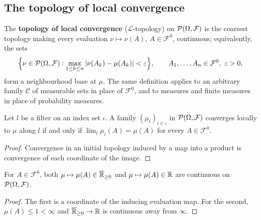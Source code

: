 \subsection*{The topology of local convergence}

\begin{definition}
    \label{def:lc-topology}
    \leanok

    The \textbf{topology of local convergence} ($\mathcal{L}$-topology) on
    $\mathcal{P}(\Omega, \mathcal{F})$ is the coarsest topology making every evaluation
    $\nu \mapsto \nu(A)$, $A \in \mathcal{F}^0$, continuous; equivalently, the sets
    \[
        \Big\{ \nu \in \mathcal{P}(\Omega, \mathcal{F}) : \max_{1 \le k \le n} |\nu(A_k) - \mu(A_k)|
        < \varepsilon \Big\},
        \qquad A_1, \dots, A_n \in \mathcal{F}^0,\ \varepsilon > 0,
    \]
    form a neighbourhood base at $\mu$. The same definition applies to an arbitrary family
    $\mathcal{C}$ of measurable sets in place of $\mathcal{F}^0$, and to measures and finite
    measures in place of probability measures.
\end{definition}

\begin{lemma}
    \label{lem:lc-tendsto-iff}
    \leanok

    Let $l$ be a filter on an index set $\iota$. A family $(\mu_i)_{i \in \iota}$ in
    $\mathcal{P}(\Omega, \mathcal{F})$ converges locally to $\mu$ along $l$ if and only if
    $\lim_l \mu_i(A) = \mu(A)$ for every $A \in \mathcal{F}^0$.
\end{lemma}
\begin{proof}
    \leanok

    Convergence in an initial topology induced by a map into a product is convergence of each
    coordinate of the image.
\end{proof}

\begin{lemma}
    \label{lem:lc-continuous-eval}
    \leanok

    For $A \in \mathcal{F}^0$, both $\mu \mapsto \mu(A) \in \overline{\mathbb{R}}_{\ge 0}$ and
    $\mu \mapsto \mu(A) \in \mathbb{R}$ are continuous on $\mathcal{P}(\Omega, \mathcal{F})$.
\end{lemma}
\begin{proof}
    \leanok

    The first is a coordinate of the inducing evaluation map. For the second,
    $\mu(A) \le 1 < \infty$ and $\overline{\mathbb{R}}_{\ge 0} \to \mathbb{R}$ is continuous away from $\infty$.
\end{proof}

